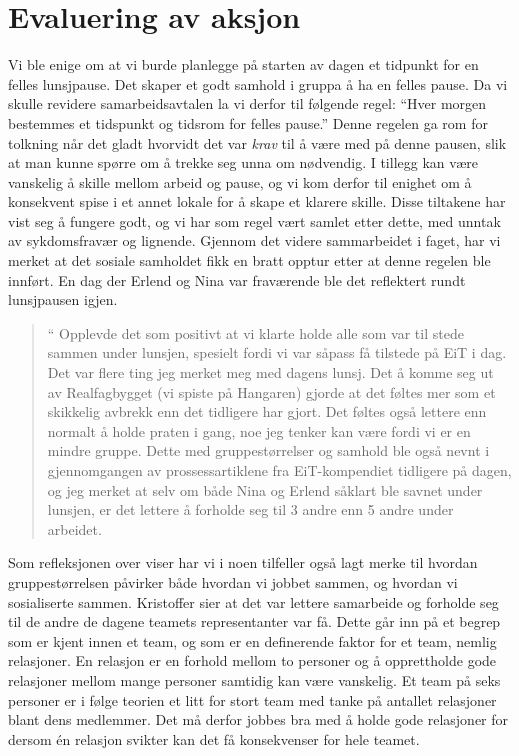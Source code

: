 
\section{Evaluering av aksjon} 

Vi ble enige om at vi burde planlegge på starten av dagen et tidpunkt for en felles lunsjpause. Det skaper et godt samhold i gruppa å ha en felles pause.  Da vi skulle revidere samarbeidsavtalen la vi derfor til følgende regel:  ``Hver morgen bestemmes et tidspunkt og tidsrom for felles pause.'' Denne regelen ga rom for tolkning når det gladt hvorvidt det var \emph{krav} til å være med på denne pausen, slik at man kunne spørre om å trekke seg unna om nødvendig. I tillegg kan være vanskelig å skille mellom arbeid og pause, og vi kom derfor til enighet om å konsekvent spise i et annet lokale for å skape et klarere skille. Disse tiltakene har vist seg å fungere godt, og vi har som regel vært samlet etter dette, med unntak av sykdomsfravær og lignende. Gjennom det videre sammarbeidet i faget, har vi merket at det sosiale samholdet fikk en bratt opptur etter at denne regelen ble innført. En dag der Erlend og Nina var fraværende ble det reflektert rundt lunsjpausen igjen.

\begin{quote}``
Opplevde det som positivt at vi klarte holde alle som var til stede sammen under lunsjen, spesielt fordi vi var såpass få tilstede på EiT i dag. Det var flere ting jeg merket meg med dagens lunsj. Det å komme seg ut av Realfagbygget (vi spiste på Hangaren) gjorde at det føltes mer som et skikkelig avbrekk enn det tidligere har gjort. Det føltes også lettere enn normalt å holde praten i gang, noe jeg tenker kan være fordi vi er en mindre gruppe. Dette med gruppestørrelser og samhold ble også nevnt i gjennomgangen av prossessartiklene fra EiT-kompendiet tidligere på dagen, og jeg merket at selv om både Nina og Erlend såklart ble savnet under lunsjen, er det lettere å forholde seg til 3 andre enn 5 andre under arbeidet.
\end{quote} 

Som refleksjonen over viser har vi i noen tilfeller også lagt merke til hvordan gruppestørrelsen påvirker både hvordan vi jobbet sammen, og hvordan vi sosialiserte sammen. Kristoffer sier at det var lettere samarbeide og forholde seg til de andre de dagene teamets representanter var få. Dette går inn på et begrep som er kjent innen et team, og som er en definerende faktor for et team, nemlig relasjoner. 
En relasjon er en forhold mellom to personer og å opprettholde gode relasjoner mellom mange personer samtidig
kan være vanskelig. Et team på seks personer er i følge teorien  \cite{Artikkel4} et litt for stort team med tanke på antallet relasjoner
blant dens medlemmer. Det må derfor jobbes bra med å holde gode relasjoner for dersom én relasjon svikter kan det få 
konsekvenser for hele teamet. 

